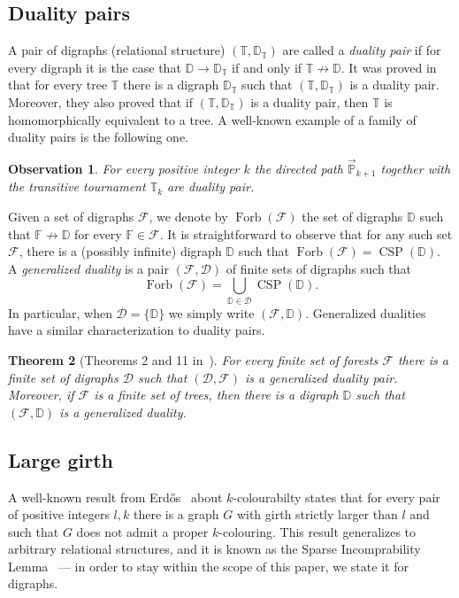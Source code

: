 \documentclass{article}
\newtheorem{theorem}{Theorem}
\newtheorem{observation}[theorem]{Observation}
\theoremstyle{definition}
\theoremstyle{remark}
\DeclareMathOperator{\Forb}{Forb}
\DeclareMathOperator{\CSP}{CSP}
\newcommand{\bD}{{\mathbb D}}
\newcommand{\bF}{{\mathbb F}}
\newcommand{\bP}{{\mathbb P}}
\newcommand{\bT}{{\mathbb T}}
\newcommand{\calD}{{\mathcal D}}
\newcommand{\calF}{{\mathcal F}}
\begin{document}
\subsection{Duality pairs}

A pair of digraphs (relational structure) $(\bT,\bD_\bT)$ are called
a \emph{duality pair} if for every digraph it is the case that
$\bD\to \bD_\bT$ if and only if $\bT \not\to \bD$. It was proved in~\cite{NesetrilTardif}
that for every tree $\bT$ there is a digraph $\bD_\bT$ such that $(\bT,\bD_\bT)$
is a duality pair. Moreover, they also proved that if $(\bT,\bD_\bT)$ is 
a duality pair, then $\bT$ is homomorphically equivalent to a tree.
A well-known example of a family of duality pairs is the following one. 


\begin{observation}\label{obs:P-TT}
    For every positive integer $k$ the directed path $\vec{\bP}_{k+1}$
    together with the transitive tournament $\bT_k$ are duality pair.
\end{observation}

Given a set of digraphs $\calF$, we denote by $\Forb(\calF)$ the 
set of digraphs $\bD$ such that $\bF\not\to \bD$ for every $\bF\in \calF$. 
It is straightforward to observe that for any such set $\calF$, 
there is a (possibly infinite) digraph $\bD$ such that $\Forb(\calF)
= \CSP(\bD)$. 
A \emph{generalized duality} is a pair $(\calF, \calD)$ of finite
sets of digraphs such that 
\[
\Forb(\calF) = \bigcup_{\bD\in\calD} \CSP(\bD).
\]
In particular, when $\calD = \{\bD\}$ we simply write $(\calF, \bD)$.
Generalized dualities have a similar characterization to duality pairs.

\begin{theorem}[Theorems 2 and 11 in~\cite{FoniokNesetril}]\label{thm:gen-dualities}
For every finite set of forests $\calF$ there is a finite set of
digraphs $\calD$ such that $(\calD, \calF)$ is a generalized duality pair. 
Moreover, if $\calF$ is a finite set of trees, then there is a digraph
$\bD$ such that $(\calF, \bD)$ is a generalized duality.
\end{theorem}


\subsection{Large girth}


A well-known result from Erd\H{o}s~\cite{Erd:Gtp} about $k$-colourabilty states that for
every pair of positive integers $l,k$ there is a graph $G$ with girth strictly larger
than $l$ and such that $G$ does not admit a proper $k$-colouring. This result generalizes
to arbitrary relational structures, and it is known as the Sparse Incomprability Lemma~\cite{Kun}
--- in order to stay within the scope of this paper, we state it for digraphs.
\end{document}
